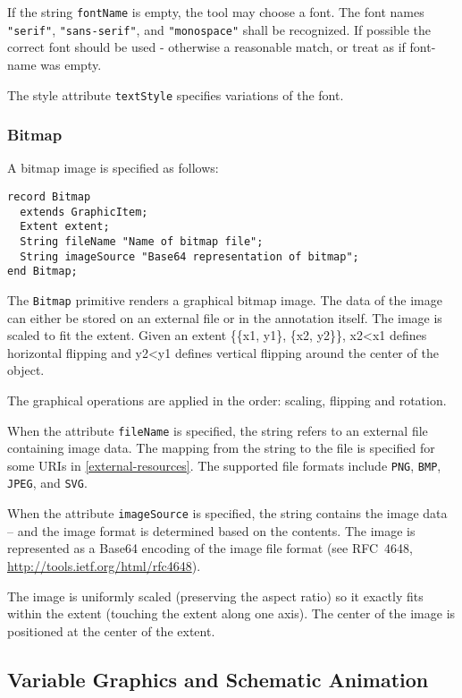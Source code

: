 If the string \lstinline!fontName! is empty, the tool may choose a font. The font
names \lstinline!"serif"!, \lstinline!"sans-serif"!, and \lstinline!"monospace"! shall be recognized. If
possible the correct font should be used - otherwise a reasonable match,
or treat as if font-name was empty.

The style attribute \lstinline!textStyle! specifies variations of the font.

\subsubsection{Bitmap}\label{bitmap}

A bitmap image is specified as follows:
\begin{lstlisting}[language=modelica]
record Bitmap
  extends GraphicItem;
  Extent extent;
  String fileName "Name of bitmap file";
  String imageSource "Base64 representation of bitmap";
end Bitmap;
\end{lstlisting}
The \lstinline!Bitmap! primitive renders a graphical bitmap image. The data of the
image can either be stored on an external file or in the annotation
itself. The image is scaled to fit the extent. Given an extent \{\{x1,
y1\}, \{x2, y2\}\}, x2\textless{}x1 defines horizontal flipping and
y2\textless{}y1 defines vertical flipping around the center of the
object.

The graphical operations are applied in the order: scaling, flipping and
rotation.

When the attribute \lstinline!fileName! is specified, the string refers to an
external file containing image data. The mapping from the string to the
file is specified for some URIs in \cref{external-resources}. The supported file
formats include \lstinline!PNG!, \lstinline!BMP!, \lstinline!JPEG!,
and \lstinline!SVG!.

When the attribute \lstinline!imageSource! is specified, the string contains the
image data -- and the image format is determined based on the contents.
The image is represented as a Base64 encoding of the image file format
(see RFC~4648, \url{http://tools.ietf.org/html/rfc4648}).

The image is uniformly scaled (preserving the aspect ratio) so it exactly fits within the extent (touching the
extent along one axis).  The center of the image is positioned at the center of the extent.

\subsection{Variable Graphics and Schematic Animation}\label{variable-graphics-and-schematic-animation}

